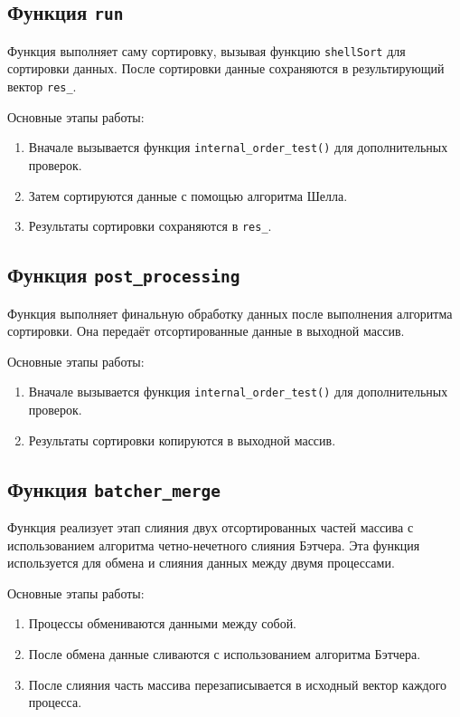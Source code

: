 \documentclass[a4paper,12pt]{article}
\begin{document}
\subsection{Функция \texttt{run}}
Функция выполняет саму сортировку, вызывая функцию \texttt{shellSort} для сортировки данных. После сортировки данные сохраняются в результирующий вектор \texttt{res\_}.

Основные этапы работы:
\begin{enumerate}
  \item Вначале вызывается функция \texttt{internal\_order\_test()} для дополнительных проверок.
  \item Затем сортируются данные с помощью алгоритма Шелла.
  \item Результаты сортировки сохраняются в \texttt{res\_}.
\end{enumerate}

\subsection{Функция \texttt{post\_processing}}
Функция выполняет финальную обработку данных после выполнения алгоритма сортировки. Она передаёт отсортированные данные в выходной массив.

Основные этапы работы:
\begin{enumerate}
  \item Вначале вызывается функция \texttt{internal\_order\_test()} для дополнительных проверок.
  \item Результаты сортировки копируются в выходной массив.
\end{enumerate}

\subsection{Функция \texttt{batcher\_merge}}
Функция реализует этап слияния двух отсортированных частей массива с использованием алгоритма четно-нечетного слияния Бэтчера. Эта функция используется для обмена и слияния данных между двумя процессами.

Основные этапы работы:
\begin{enumerate}
  \item Процессы обмениваются данными между собой.
  \item После обмена данные сливаются с использованием алгоритма Бэтчера.
  \item После слияния часть массива перезаписывается в исходный вектор каждого процесса.
\end{enumerate}
\end{document}
